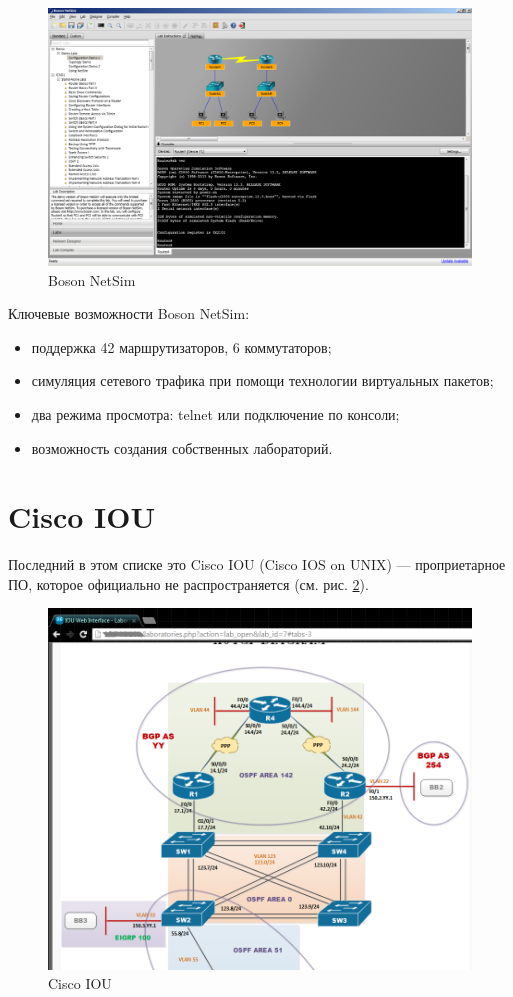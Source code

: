 \documentclass[a4paper,14pt]{extreport}
\begin{document}
	
	\begin{figure}
		\centering
		\includegraphics[width=0.9\linewidth]{pic/netsim}
		\caption{Boson NetSim}
		\label{fig:netsim}
	\end{figure}
	
	Ключевые возможности Boson NetSim:
	
	\begin{itemize}
		\item поддержка  42 маршрутизаторов, 6 коммутаторов;
		\item симуляция сетевого трафика при помощи технологии виртуальных
		пакетов;
		\item два режима просмотра: telnet или подключение по консоли;
		\item возможность создания собственных лабораторий.
	\end{itemize}
	
	

	
	\section{Cisco IOU}
	
	Последний в этом списке это  Cisco IOU (Cisco IOS on UNIX) —
	проприетарное ПО, которое официально не распространяется (см. рис. \ref*{fig:ciscoIOU}).
	
	\begin{figure}[h!]
		\centering
		\includegraphics[width=0.7\linewidth]{pic/ciscoIOU}
		\caption{Cisco IOU}
		\label{fig:ciscoIOU}
	\end{figure}
	
\end{document}
